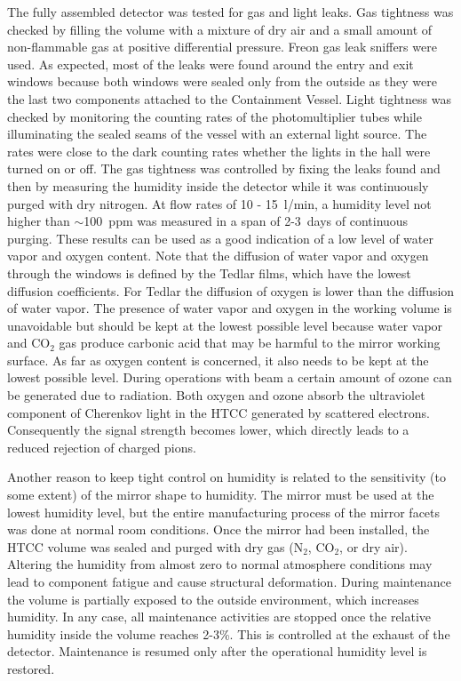 The fully assembled detector was tested for gas and light leaks. Gas tightness was checked by filling the volume
with a mixture of dry air and a small amount of non-flammable gas at positive differential pressure. Freon gas leak
sniffers were used. As expected, most of the leaks were found around the entry and exit windows because both
windows were sealed only from the outside as they were the last two components attached to the Containment
Vessel. Light tightness was checked by monitoring the counting rates of the photomultiplier tubes while illuminating
the sealed seams of the vessel with an external light source. The rates were close to the dark counting rates whether
the lights in the hall were turned on or off. The gas tightness was controlled by fixing the leaks found and then by
measuring the humidity inside the detector while it was continuously purged with dry nitrogen. At flow rates of
10 - 15~l/min, a humidity level not higher than $\sim$100~ppm was measured in a span of 2-3~days of continuous
purging. These results can be used as a good indication of a low level of water vapor and oxygen content. Note that
the diffusion of water vapor and oxygen through the windows is defined by the Tedlar films, which have the lowest
diffusion coefficients. For Tedlar the diffusion of oxygen is lower than the diffusion of water vapor. The presence of
water vapor and oxygen in the working volume is unavoidable but should be kept at the lowest possible level because
water vapor and CO${_2}$ gas produce carbonic acid that may be harmful to the mirror working surface. As far as
oxygen content is concerned, it also needs to be kept at the lowest possible level. During operations with beam a
certain amount of ozone can be generated due to radiation. Both oxygen and ozone absorb the ultraviolet component
of Cherenkov light in the HTCC generated by scattered electrons. Consequently the signal strength becomes lower,
which directly leads to a reduced rejection of charged pions.

Another reason to keep tight control on humidity is related to the sensitivity (to some extent) of the mirror shape
to humidity. The mirror must be used at the lowest humidity level, but the entire manufacturing process of the
mirror facets was done at normal room conditions. Once the mirror had been installed, the HTCC volume was sealed
and purged with dry gas (N${_2}$, CO${_2}$, or dry air). Altering the humidity from almost zero to normal
atmosphere conditions may lead to component fatigue and cause structural deformation. During maintenance the
volume is partially exposed to the outside environment, which increases humidity. In any case, all maintenance
activities are stopped once the relative humidity inside the volume reaches 2-3\%. This is controlled at the exhaust
of the detector. Maintenance is resumed only after the operational humidity level is restored.

